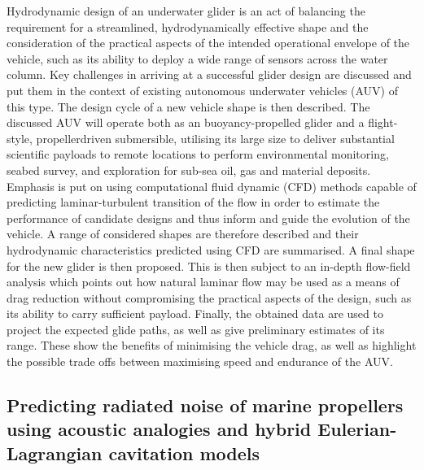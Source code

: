 \documentclass[a4paper,10pt]{article}
\begin{document}
	Hydrodynamic design of an underwater glider is an act of balancing the requirement for a streamlined, hydrodynamically effective shape and the consideration of the practical aspects of the intended operational envelope of the vehicle, such as its ability to deploy a wide range of sensors across the water column. Key challenges in arriving at a successful glider design are discussed and put them in the context of existing autonomous underwater vehicles (AUV) of this type. The design cycle of a new vehicle shape is then described. The discussed AUV will operate both as an buoyancy-propelled glider and a flight-style, propellerdriven submersible, utilising its large size to deliver substantial scientific payloads to remote locations to perform environmental monitoring, seabed survey, and exploration for sub-sea oil, gas and material deposits. Emphasis is put on using computational fluid dynamic (CFD) methods capable of predicting laminar-turbulent transition of the flow in order to estimate the performance of candidate designs and thus inform and guide the evolution of the vehicle. A range of considered shapes are therefore described and their hydrodynamic characteristics predicted using CFD are summarised. A final shape for the new glider is then proposed. This is then subject to an in-depth flow-field analysis which points out how natural laminar flow may be used as a means of drag reduction without compromising the practical aspects of the design, such as its ability to carry sufficient payload. Finally, the obtained data are used to project the expected glide paths, as well as give preliminary estimates of its range. These show the benefits of minimising the vehicle drag, as well as highlight the possible trade offs between maximising speed and endurance of the AUV.

\subsection{Predicting radiated noise of marine propellers using acoustic analogies and hybrid Eulerian-Lagrangian cavitation models \cite{Lidtke2017d}}
\end{document}
